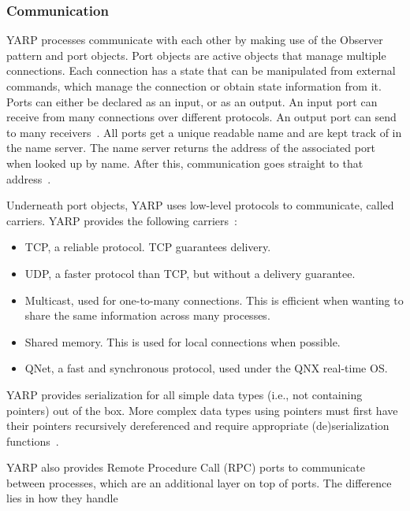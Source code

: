 \documentclass[a4paper]{book}
\begin{document}
\subsubsection{Communication}
\label{sec:yarp-communication}
YARP processes communicate with each other by making use of the Observer pattern
and port objects. Port objects are active objects that manage multiple
connections. Each connection has a state that can be manipulated from external
commands, which manage the connection or obtain state information from it. Ports
can either be declared as an input, or as an output. An input port can receive
from many connections over different protocols. An output port can send to many
receivers~\cite{metta2006yarp}. All ports get a unique readable name and are
kept track of in the name server. The name server returns the address of the
associated port when looked up by name. After this, communication goes straight
to that address~\cite{metta2006yarp, yarp_docs_terms}.
\par
Underneath port objects, YARP uses low-level protocols to communicate, called
carriers. YARP provides the following carriers~\cite{metta2006yarp,
yarp_docs_terms}:
\begin{itemize}
	\item TCP, a reliable protocol. TCP guarantees
	      delivery.
	\item UDP, a faster protocol than TCP, but without a delivery guarantee.
	\item Multicast, used for one-to-many connections. This is efficient when
        wanting to share the same information across many processes.
	\item Shared memory. This is used for local connections when possible.
	\item QNet, a fast and synchronous protocol, used under the QNX real-time
        OS.
\end{itemize}
\par
YARP provides serialization for all simple data types (i.e., not containing
pointers) out of the box. More complex data types using pointers must first have
their pointers recursively dereferenced and require appropriate
(de)serialization functions~\cite{metta2006yarp}.
\par
YARP also provides Remote Procedure Call (RPC) ports to communicate between
processes, which are an additional layer on top of ports. The difference lies in
how they handle
\end{document}

